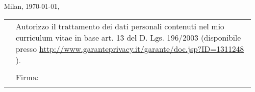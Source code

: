 \documentclass[totpages,helvetica,openbib,english,flagCMYK]{europecv}
\begin{document}
\vspace{15pt}
\flushright
Milan, \today, \\
\vspace{10pt}
\underline{\hspace{250pt}}
	
\null{}
\flushright
\begin{tabular}{rp{250pt}}
 & \small Autorizzo il trattamento dei dati personali contenuti
 nel mio curriculum vitae in base art. 13 del D.
 Lgs. 196/2003 (disponibile presso
 \url{http://www.garanteprivacy.it/garante/doc.jsp?ID=1311248} ).
 \\
 &  \\ 
 & Firma:\\ 
 & \underline{\hspace{250pt}} \\
\end{tabular} 
\end{document}

